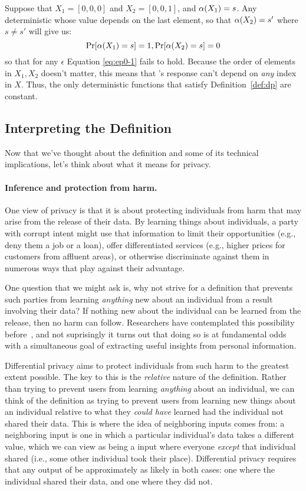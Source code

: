 \documentclass[11pt,twoside]{scrartcl}
\begin{document}
Suppose that $X_1 = [0, 0, 0]$ and $X_2 = [0, 0, 1]$, and $\alpha(X_1) = s$. Any deterministic \san whose value depends on the last element, so that $\alpha(X_2) = s'$ where $s \ne s'$ will give us:
\[
\mathrm{Pr}[\alpha(X_1) = s] = 1, \mathrm{Pr}[\alpha(X_2) = s] = 0
\]
so that for any $\epsilon$ Equation \ref{eq:ep0-1} fails to hold. Because the order of elements in $X_1, X_2$ doesn't matter, this means that \san's response can't depend on \emph{any} index in $X$. Thus, the only deterministic functions that satisfy Definition~\ref{def:dp} are constant.

\subsection{Interpreting the Definition}

Now that we've thought about the definition and some of its technical implications, let's think about what it means for privacy. 

\paragraph{Inference and protection from harm.} One view of privacy is that it is about protecting individuals from harm that may arise from the release of their data. By learning things about individuals, a party with corrupt intent might use that information to limit their opportunities (e.g., deny them a job or a loan), offer differentiated services (e.g., higher prices for customers from affluent areas), or otherwise discriminate against them in numerous ways that play against their advantage.

One question that we might ask is, why not strive for a definition that prevents such parties from learning \emph{anything} new about an individual from a result involving their data? If nothing new about the individual can be learned from the release, then no harm can follow. Researchers have contemplated this possibility before~\cite{dwork06}, and not suprisingly it turns out that doing so is at fundamental odds with a simultaneous goal of extracting useful insights from personal information.

Differential privacy aims to protect individuals from such harm to the greatest extent possible. The key to this is the \emph{relative} nature of the definition. Rather than trying to prevent users from learning \emph{anything} about an individual, we can think of the definition as trying to prevent users from learning new things about an individual relative to what they \emph{could have} learned had the individual not shared their data. This is where the idea of neighboring inputs comes from: a neighboring input is one in which a particular individual's data takes a different value, which we can view as being a input where everyone \emph{except} that individual shared (i.e., some other individual took their place). Differential privacy requires that any output of \san be approximately as likely in both cases: one where the individual shared their data, and one where they did not.
\end{document}
